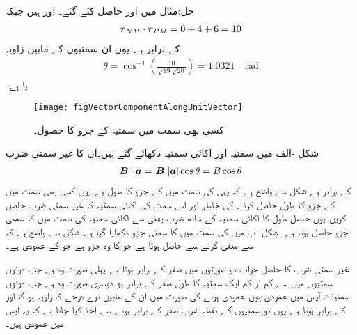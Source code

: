 حل:مثال   میں   اور  حاصل کئے گئے۔  اور  ہیں جبکہ
\begin{align*}
{\ensuremath{{\boldsymbol{r}}}}_{NM} \cdot {\ensuremath{{\boldsymbol{r}}}}_{PM}=0+4+6=10
\end{align*}
کے برابر ہے۔یوں ان سمتیوں کے مابین زاویہ
\begin{align*}
\theta=\cos^{-1} \left(\frac{10}{\sqrt{19} \sqrt{20}} \right)=1.0321 \quad \si{\radian}
\end{align*}
یا  ہے۔
\begin{figure}
\centering
\texttt{[image: figVectorComponentAlongUnitVector]}
\caption{کسی بھی سمت میں سمتیہ کے جزو کا حصول۔}
\label{شکل_سمتیہ_کسی_سمت_میں_جزو}
\end{figure}
شکل -الف میں سمتیہ  اور اکائی سمتیہ   دکھائے گئے ہیں۔ان کا غیر سمتی ضرب
\begin{align*}
{\ensuremath{{\boldsymbol{B}}}} \cdot {\ensuremath{{\boldsymbol{a}}}} = \abs{{{\boldsymbol{B}}}} \abs{{{\boldsymbol{a}}}} \cos \theta=B \cos \theta
\end{align*}
کے برابر ہے۔شکل سے واضح ہے کہ یہی  کی سمت میں  کے جزو کا طول  ہے۔یوں کسی بھی سمت میں  کے جزو کا طول حاصل کرنے کی خاطر  اور اس سمت کی اکائی سمتیہ کا غیر سمتی ضرب حاصل کریں۔یوں حاصل طول کا اکائی سمتیہ کے ساتھ ضرب یعنی  سے اکائی سمتیہ کی سمت میں  کا سمتی جزو  حاصل ہوتا ہے۔ شکل -ب میں  کی سمت میں  کا سمتی جزو  دکھایا گیا ہے۔شکل سے واضح ہے کہ  سے  منفی کرنے سے   حاصل ہوتا ہے جو  کا وہ جزو ہے جو  کے عمودی ہے۔

غیر سمتی ضرب کا حاصل جواب دو صورتوں میں صفر کے برابر ہوتا ہے۔پہلی صورت وہ ہے جب دونوں سمتیوں میں سے کم از کم ایک سمتیہ کا طول صفر کے برابر ہو۔دوسری صورت وہ ہے جب دونوں سمتیات آپس میں عمودی ہوں۔عمودی ہونے کی صورت میں ان کے مابین نوے درجے کا زاویہ ہو گا اور  کے برابر ہوتا ہے۔یوں دو سمتیوں کے نقطہ ضرب صفر کے برابر ہونے  سے اخذ کیا جاتا ہے کہ یہ آپس میں عمودی ہیں۔

